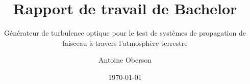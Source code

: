 \author{Antoine Oberson}


\title{Rapport de travail de Bachelor}

\subtitle{Générateur de turbulence optique pour le test de systèmes de propagation de faisceau à travers l'atmosphère terrestre}



\date{\today}


